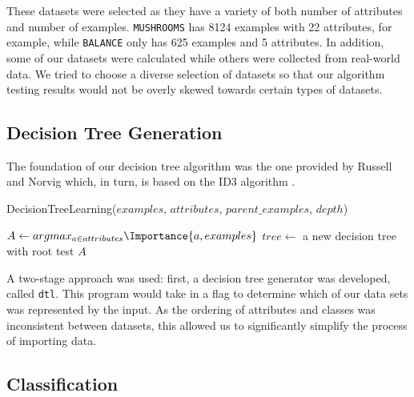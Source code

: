 \documentclass[screen, authorversion, nonacm, sigconf]{acmart}
\begin{document}
These datasets were selected as they have a variety of both number of attributes and number of examples. \texttt{MUSHROOMS} has 8124 examples with 22 attributes, for example, while \texttt{BALANCE} only has 625 examples and 5 attributes. In addition, some of our datasets were calculated while others were collected from real-world data. We tried to choose a diverse selection of datasets so that our algorithm testing results would not be overly skewed towards certain types of datasets.

\subsection{Decision Tree Generation}

The foundation of our decision tree algorithm was the one provided by Russell and Norvig \cite{russell_norvig_2010} which, in turn, is based on the ID3 algorithm \cite{Quinlan1986}.

\begin{function}
	\SetAlgoLined
  \caption{DecisionTreeLearning($examples$, $attributes$, $parent\_examples$, $depth$)}
  \label{algo:DecisionTreeLearning}
  $A \gets argmax_{a \in attributes} \Importance{a, examples}$\;
  $tree \gets$ a new decision tree with root test $A$\;
  \;
\end{function}

A two-stage approach was used: first, a decision tree generator was developed, called \texttt{dtl}. This program would take in a flag to determine which of our data sets was represented by the input. As the ordering of attributes and classes was inconsistent between datasets, this allowed us to significantly simplify the process of importing data.

\subsection{Classification}
\end{document}

